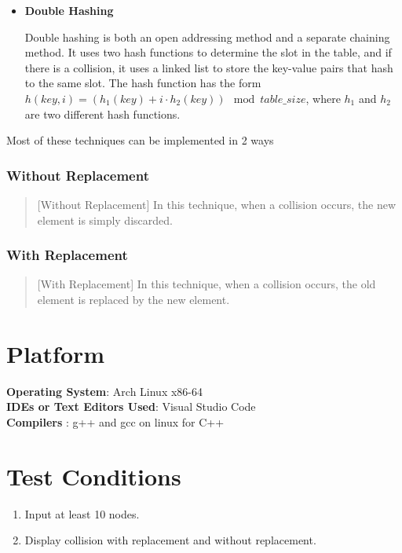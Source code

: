 \documentclass[11pt]{article}
\begin{document}
\begin{itemize}
    \item \textbf{Double Hashing}
    
    Double hashing is both an open addressing method and a separate chaining method. It uses two hash functions to determine the slot in the table, and if there is a collision, it uses a linked list to store the key-value pairs that hash to the same slot. The hash function has the form $h(key, i) = (h_1(key) + i \cdot h_2(key)) \mod table\_size$, where $h_1$ and $h_2$ are two different hash functions.
\end{itemize}

Most of these techniques can be implemented in 2 ways \\

\subsubsection{Without Replacement}
\begin{quote}[Without Replacement]
    In this technique, when a collision occurs, the new element is simply
    discarded.
\end{quote}


\subsubsection{With Replacement}
\begin{quote}[With Replacement]
    In this technique, when a collision occurs, the old element is replaced by
    the new element.
\end{quote}



\section{Platform}
\textbf{\textbf{Operating System}}: Arch Linux x86-64 \\
\textbf{\textbf{IDEs or Text Editors Used}}: Visual Studio Code\\
\textbf{\textbf{Compilers} }: g++ and gcc on linux for C++\\

\section{Test Conditions}
\begin{enumerate}
    \item Input at least 10 nodes.
    \item Display collision with replacement and without replacement.
\end{enumerate}
\end{document}
